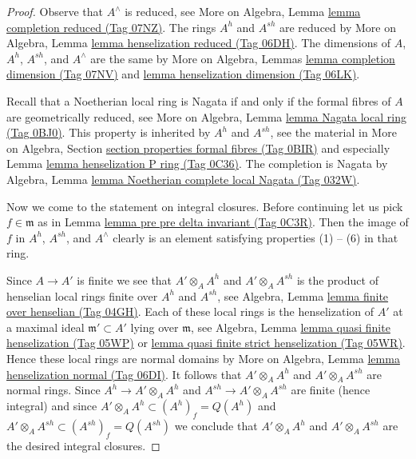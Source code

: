 \documentclass{amsart}
\theoremstyle{plain}
\theoremstyle{definition}
\theoremstyle{remark}
\numberwithin{equation}{subsection}
\begin{document}
\begin{proof}
Observe that $A^\wedge$ is reduced, see
More on Algebra, Lemma \href{https://stacks.math.columbia.edu/tag/07NZ}{lemma completion reduced (Tag 07NZ)}.
The rings $A^h$ and $A^{sh}$ are reduced by
More on Algebra, Lemma \href{https://stacks.math.columbia.edu/tag/06DH}{lemma henselization reduced (Tag 06DH)}.
The dimensions of $A$, $A^h$, $A^{sh}$, and $A^\wedge$ are the same
by More on Algebra, Lemmas
\href{https://stacks.math.columbia.edu/tag/07NV}{lemma completion dimension (Tag 07NV)} and
\href{https://stacks.math.columbia.edu/tag/06LK}{lemma henselization dimension (Tag 06LK)}.

\medskip\noindent
Recall that a Noetherian local ring is Nagata if and only if the
formal fibres of $A$ are geometrically reduced, see
More on Algebra, Lemma \href{https://stacks.math.columbia.edu/tag/0BJ0}{lemma Nagata local ring (Tag 0BJ0)}.
This property is inherited by $A^h$ and $A^{sh}$, see
the material in More on Algebra, Section
\href{https://stacks.math.columbia.edu/tag/0BIR}{section properties formal fibres (Tag 0BIR)}
and especially Lemma \href{https://stacks.math.columbia.edu/tag/0C36}{lemma henselization P ring (Tag 0C36)}.
The completion is Nagata by
Algebra, Lemma \href{https://stacks.math.columbia.edu/tag/032W}{lemma Noetherian complete local Nagata (Tag 032W)}.

\medskip\noindent
Now we come to the statement on integral closures. Before continuing
let us pick $f \in \mathfrak m$ as in
Lemma \href{https://stacks.math.columbia.edu/tag/0C3R}{lemma pre pre delta invariant (Tag 0C3R)}.
Then the image of $f$ in $A^h$, $A^{sh}$, and $A^\wedge$
clearly is an element satisfying properties (1) -- (6)
in that ring.

\medskip\noindent
Since $A \to A'$ is finite we see that
$A' \otimes_A A^h$ and $A' \otimes_A A^{sh}$
is the product of henselian local rings finite over $A^h$ and
$A^{sh}$, see Algebra, Lemma \href{https://stacks.math.columbia.edu/tag/04GH}{lemma finite over henselian (Tag 04GH)}.
Each of these local rings is the henselization of $A'$ at a
maximal ideal $\mathfrak m' \subset A'$ lying over $\mathfrak m$, see
Algebra, Lemma \href{https://stacks.math.columbia.edu/tag/05WP}{lemma quasi finite henselization (Tag 05WP)} or
\href{https://stacks.math.columbia.edu/tag/05WR}{lemma quasi finite strict henselization (Tag 05WR)}.
Hence these local rings are normal domains by
More on Algebra, Lemma \href{https://stacks.math.columbia.edu/tag/06DI}{lemma henselization normal (Tag 06DI)}.
It follows that $A' \otimes_A A^h$ and $A' \otimes_A A^{sh}$
are normal rings. Since $A^h \to A' \otimes_A A^h$ and
$A^{sh} \to A' \otimes_A A^{sh}$ are finite (hence integral) and since
$A' \otimes_A A^h \subset (A^h)_f = Q(A^h)$ and
$A' \otimes_A A^{sh} \subset (A^{sh})_f = Q(A^{sh})$
we conclude that $A' \otimes_A A^h$ and $A' \otimes_A A^{sh}$ are
the desired integral closures.


\end{proof}
\end{document}
